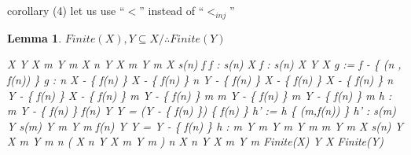 \documentclass[10pt,a4paper]{book}
\newtheorem{lemma}{Lemma}[section]
\begin{document}
corollary (4) let us use ``$<$'' instead of ``$<_{inj}$''

\begin{lemma} $ Finite(X) , Y \subseteq X / \therefore  Finite(Y)    $\\
    \begin{fitchproof}[arrayenv=tabular]

         {  X   \land Y \subseteq X \to \exists m \in {} \quad Y \cong m  }
        \open
         {  X \cong n  \land Y \subseteq X \to \exists m \in {} \quad Y \cong m  }
        \open
         {  X \cong s(n)   }
         { \exists f \quad  f : s(n)   X  }
        \open
         {  f : s(n)   X  }
         {   Y \subseteq X  }
         {   g := f - \{ (n , f(n))  \} }
         {  g : n   X - \{ f(n) \}  }
         {    X - \{ f(n) \} \cong n  }
         {   Y - \{ f(n) \}  \subseteq X  - \{ f(n) \}  }
         {  X  - \{ f(n) \} \cong n  \land Y - \{ f(n) \} \subseteq X - \{ f(n) \} \to \exists m \in {} \quad Y - \{ f(n) \} \cong m  }
         {  \exists m \in {} \quad Y - \{ f(n) \} \cong m  }
        \open
         {   Y - \{ f(n) \} \cong m  }
        \open
         { h :    m  Y - \{ f(n) \}  }
        \open
         {    f(n) \in Y  }
         {     Y = (Y - \{ f(n) \}) \cup \{ f(n) \}   }
         {     h' := h \cup \{ (m,f(n)) \}    }
         {     h' : s(m)  Y   }
         {      s(m) \cong Y   }
         {   \exists m \in {} \quad Y \cong m  }
        \close
        \open
         {   f(n) \notin Y  }
         {     Y = Y - \{ f(n) \}   }
         {     h : m  Y   }
         {      m \cong Y   }
         {   \exists m \in {} \quad Y \cong m  }
        \close
        \close
        \close
         {   \exists m \in {} \quad Y \cong m  }
        \close
        \close
         {  X \cong s(n)  \land Y \subseteq X \to \exists m \in {} \quad Y \cong m  }
        \close
         { \forall n \in {} ( X \cong n  \land Y \subseteq X \to \exists m \in {} \quad Y \cong m ) }
         { \exists n \in {} \quad X \cong n  \land Y \subseteq X \to \exists m \in {} \quad Y \cong m }
         { Finite(X) \land Y \subseteq X \to Finite(Y) }

    \end{fitchproof}
\end{lemma}
\end{document}
